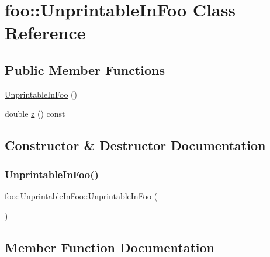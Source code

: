 \hypertarget{classfoo_1_1_unprintable_in_foo}{}\section{foo\+:\+:Unprintable\+In\+Foo Class Reference}
\label{classfoo_1_1_unprintable_in_foo}
\subsection*{Public Member Functions}
\begin{DoxyCompactItemize}
\item 
\hyperlink{classfoo_1_1_unprintable_in_foo_a120cd61575729a26a96690c8a58e41f8}{Unprintable\+In\+Foo} ()
\item 
double \hyperlink{classfoo_1_1_unprintable_in_foo_a3dc8c8e90906bb6f3376474d545e488c}{z} () const
\end{DoxyCompactItemize}


\subsection{Constructor \& Destructor Documentation}
\mbox{\label{classfoo_1_1_unprintable_in_foo_a120cd61575729a26a96690c8a58e41f8}} 
\subsubsection{\texorpdfstring{Unprintable\+In\+Foo()}{UnprintableInFoo()}}
{\footnotesize\ttfamily foo\+::\+Unprintable\+In\+Foo\+::\+Unprintable\+In\+Foo (\begin{DoxyParamCaption}{ }\end{DoxyParamCaption})\hspace{0.3cm}{\ttfamily [inline]}}



\subsection{Member Function Documentation}
\mbox{\label{classfoo_1_1_unprintable_in_foo_a3dc8c8e90906bb6f3376474d545e488c}} 
